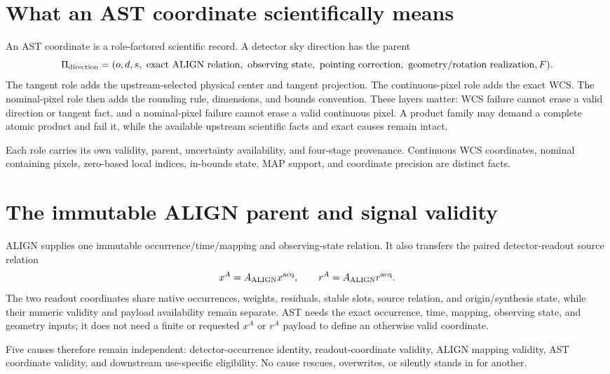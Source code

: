 \documentclass[10pt]{article}
\begin{document}
\newpage
\section{What an AST coordinate scientifically means}
An AST coordinate is a role-factored scientific record. A detector sky
direction has the parent
\begin{equation*}
 \Pi_{\rm direction}=(o,d,s,\ \text{exact ALIGN relation},\
 \text{observing state},\ \text{pointing correction},\
 \text{geometry/rotation realization},F).
\end{equation*}
The tangent role adds the upstream-selected physical center and tangent
projection. The continuous-pixel role adds the exact WCS. The nominal-pixel
role then adds the rounding rule, dimensions, and bounds convention. These
layers matter: WCS failure cannot erase a valid direction or tangent fact, and
a nominal-pixel failure cannot erase a valid continuous pixel. A product
family may demand a complete atomic product and fail it, while the available
upstream scientific facts and exact causes remain intact.

Each role carries its own validity, parent, uncertainty availability, and
four-stage provenance. Continuous WCS coordinates, nominal containing pixels,
zero-based local indices, in-bounds state, MAP support, and coordinate
precision are distinct facts.

\section{The immutable ALIGN parent and signal validity}
ALIGN supplies one immutable occurrence/time/mapping and observing-state
relation. It also transfers the paired detector-readout source relation
\begin{equation*}
 x^A=A_{\rm ALIGN}x^{\rm acq},\qquad
 r^A=A_{\rm ALIGN}r^{\rm acq}.
\end{equation*}
The two readout coordinates share native occurrences, weights, residuals,
stable slots, source relation, and origin/synthesis state, while their numeric
validity and payload availability remain separate. AST needs the exact
occurrence, time, mapping, observing state, and geometry inputs; it does not
need a finite or requested $x^A$ or $r^A$ payload to define an otherwise valid
coordinate.

Five causes therefore remain independent: detector-occurrence identity,
readout-coordinate validity, ALIGN mapping validity, AST coordinate validity,
and downstream use-specific eligibility. No cause rescues, overwrites, or
silently stands in for another.
\end{document}

